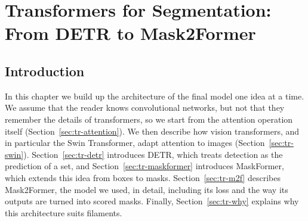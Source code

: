 \chapter{Transformers for Segmentation: From DETR to Mask2Former}\label{ch:transformers}

\section{Introduction}\label{sec:tr-intro}
In this chapter we build up the architecture of the final model one idea at a time. We assume that
the reader knows convolutional networks, but not that they remember the details of transformers, so
we start from the attention operation itself (Section~\ref{sec:tr-attention}). We then describe how
vision transformers, and in particular the Swin Transformer, adapt attention to images
(Section~\ref{sec:tr-swin}). Section~\ref{sec:tr-detr} introduces DETR, which treats detection as the
prediction of a set, and Section~\ref{sec:tr-maskformer} introduces MaskFormer, which extends this
idea from boxes to masks. Section~\ref{sec:tr-m2f} describes Mask2Former, the model we used, in
detail, including its loss and the way its outputs are turned into scored masks. Finally,
Section~\ref{sec:tr-why} explains why this architecture suits filaments.

